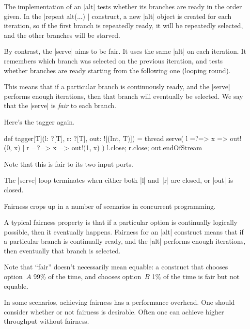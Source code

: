 \documentclass[notes,color]{sepslide0}
\begin{document}

\begin{slide}

The implementation of an |alt| tests whether its branches are ready in the order
given.  In the |repeat{ alt(...) }| construct, a new |alt| object is created
for each iteration, so if the first branch is repeatedly ready, it will be
repeatedly selected, and the other branches will be starved.

By contrast, the |serve| aims to be fair.  It uses the same |alt| on each
iteration.  It remembers which branch was selected on the previous iteration,
and tests whether branches are ready starting from the following one (looping
round).

This means that if a particular branch is continuously ready, and the |serve|
performs enough iterations, then that branch will eventually be selected.  We
say that the |serve| is \emph{fair} to each branch.
\end{slide}



\begin{slide}

Here's the tagger again.
%
\begin{scala}
def tagger[T](l: ?[T], r: ?[T], out: ![(Int, T)]) = thread{
  serve( l =?=> { x => out!(0, x) }
       | r =?=> { x => out!(1, x) }
  )
  l.close; r.close; out.endOfStream
}
\end{scala}
%
Note that this is fair to its two input ports. 

The |serve| loop terminates when either both |l| and~|r| are closed, or |out|
is closed. 
\end{slide}



\begin{slide}

Fairness crops up in a number of scenarios in concurrent programming.

A typical fairness property is that if a particular option is continually
logically possible, then it eventually happens.  Fairness for an |alt|
construct means that if a particular branch is continually ready, and the
|alt| performs enough iterations, then eventually that branch is selected.

Note that ``fair'' doesn't necessarily mean equable: a construct that chooses
option~$A$ 99\% of the time, and chooses option~$B$ 1\% of the time is fair
but not equable.  

In some scenarios, achieving fairness has a performance overhead.  One should
consider whether or not fairness is desirable.  Often one can achieve higher
throughput without fairness.
\end{slide}
\end{document}
